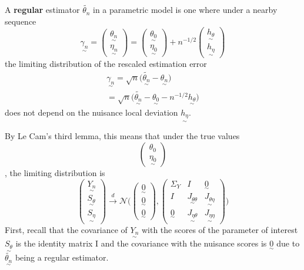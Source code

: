 \documentclass[twoside]{article}
\newcommand{\utilde}{\underset{\sim}}
\begin{document}
A \textbf{regular} estimator $\tilde{\theta_{n}}$ in a parametric model is one where under a nearby sequence 
$$
\utilde{\gamma_{n}} = 
\begin{pmatrix}
\utilde{\theta_{n}}\\
\utilde{\eta_{n}}
\end{pmatrix}
 = 
\begin{pmatrix}
\utilde{\theta_{0}}\\
\utilde{\eta_{0}}
\end{pmatrix} + n^{-1/2}
\begin{pmatrix}
\utilde{h_{\theta}}\\
\utilde{h_{\eta}}
\end{pmatrix}
$$
the limiting distribution of the rescaled estimation error 
\begin{align}
\utilde{\gamma_{n}} = \sqrt{n}\big(\tilde{\utilde{\theta_{n}}} - \utilde{\theta_{n}} \big)
\\ = \sqrt{n}\big(\tilde{\utilde{\theta_{n}}} - \utilde{\theta_{0}} - n^{-1/2}\utilde{h_{\theta}} \big)
\end{align}
does not depend on the nuisance local deviation $\utilde{h_{\eta}}.$ 

By Le Cam's third lemma, this means that under the true values $$\begin{pmatrix}\theta_0 \\ \utilde{\eta_{0}} \end{pmatrix}$$, the limiting distribution is 
$$
\begin{pmatrix}
\utilde{Y_{n}}\\
\utilde{S_{\theta}}\\
\utilde{S_{\eta}}
\end{pmatrix}
\xrightarrow{d}
\mathcal{N}
\bigg( 
\begin{pmatrix}  
\utilde{0}\\
\utilde{0}\\
\utilde{0}
\end{pmatrix} , 
\begin{pmatrix}
\Sigma_Y & I & \utilde{0}\\
I & \utilde{J_{\theta \theta}} & \utilde{J_{\theta \eta}}\\
\utilde{0} & \utilde{J_{\eta \theta}} & \utilde{J_{\eta \eta}}
\end{pmatrix}
\bigg)
$$
First, recall that the covariance of $\utilde{Y_{n}}$ with the scores of the parameter of interest $\utilde{S_{\theta}}$ is the identity matrix I and the covariance with the nuisance scores is $\utilde{0}$ due to $\tilde{\utilde{\theta_{n}}}$ being a regular estimator.
\end{document}
